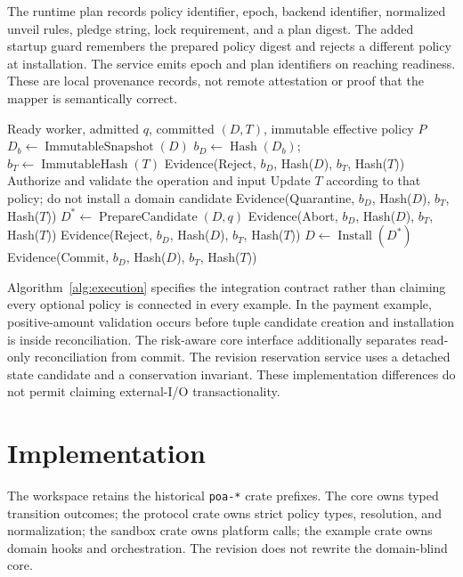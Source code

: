 \documentclass[electronics,article,submit,pdftex,moreauthors]{Definitions/mdpi}
\begin{document}
The runtime plan records policy identifier, epoch, backend identifier, normalized unveil rules, pledge string, lock requirement, and a plan digest. The added startup guard remembers the prepared policy digest and rejects a different policy at installation. The service emits epoch and plan identifiers on reaching readiness. These are local provenance records, not remote attestation or proof that the mapper is semantically correct.

\begin{algorithm}[H]\caption{Serial protected completion; native termination is observed externally.}\label{alg:execution}
\begin{algorithmic}[1]
\Require Ready worker, admitted $q$, committed $(D,T)$, immutable effective policy $P$
\State $D_b\gets\operatorname{ImmutableSnapshot}(D)$
\State $b_D\gets\operatorname{Hash}(D_b)$; $b_T\gets\operatorname{ImmutableHash}(T)$
  \State \Return Evidence(Reject, $b_D$, Hash($D$), $b_T$, Hash($T$))
\EndIf
\State Authorize and validate the operation and input
  \State Update $T$ according to that policy; do not install a domain candidate
  \State \Return Evidence(Quarantine, $b_D$, Hash($D$), $b_T$, Hash($T$))
\EndIf
\State $D^*\gets\operatorname{PrepareCandidate}(D,q)$
  \State \Return Evidence(Abort, $b_D$, Hash($D$), $b_T$, Hash($T$))
\EndIf
{}
  \State \Return Evidence(Reject, $b_D$, Hash($D$), $b_T$, Hash($T$))
\EndIf
\State $D\gets\operatorname{Install}(D^*)$
\State \Return Evidence(Commit, $b_D$, Hash($D$), $b_T$, Hash($T$))
\end{algorithmic}\end{algorithm}

Algorithm~\ref{alg:execution} specifies the integration contract rather than claiming every optional policy is connected in every example. In the payment example, positive-amount validation occurs before tuple candidate creation and installation is inside reconciliation. The risk-aware core interface additionally separates read-only reconciliation from commit. The revision reservation service uses a detached state candidate and a conservation invariant. These implementation differences do not permit claiming external-I/O transactionality.

\section{Implementation}\label{sec:implementation}
The workspace retains the historical \texttt{poa-*} crate prefixes. The core owns typed transition outcomes; the protocol crate owns strict policy types, resolution, and normalization; the sandbox crate owns platform calls; the example crate owns domain hooks and orchestration. The revision does not rewrite the domain-blind core.
\end{document}
